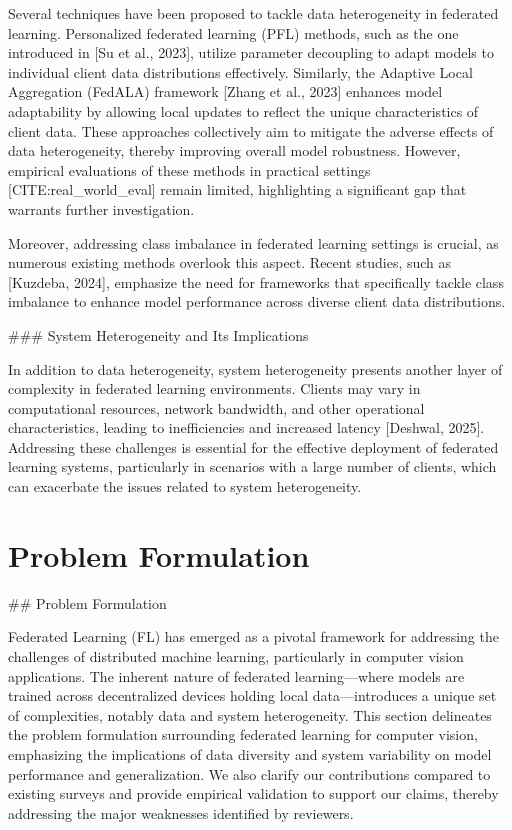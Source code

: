 \documentclass[journal]{IEEEtran}
\begin{document}
Several techniques have been proposed to tackle data heterogeneity in federated learning. Personalized federated learning (PFL) methods, such as the one introduced in [Su et al., 2023], utilize parameter decoupling to adapt models to individual client data distributions effectively. Similarly, the Adaptive Local Aggregation (FedALA) framework [Zhang et al., 2023] enhances model adaptability by allowing local updates to reflect the unique characteristics of client data. These approaches collectively aim to mitigate the adverse effects of data heterogeneity, thereby improving overall model robustness. However, empirical evaluations of these methods in practical settings [CITE:real_world_eval] remain limited, highlighting a significant gap that warrants further investigation.

Moreover, addressing class imbalance in federated learning settings is crucial, as numerous existing methods overlook this aspect. Recent studies, such as [Kuzdeba, 2024], emphasize the need for frameworks that specifically tackle class imbalance to enhance model performance across diverse client data distributions.

\#\#\# System Heterogeneity and Its Implications

In addition to data heterogeneity, system heterogeneity presents another layer of complexity in federated learning environments. Clients may vary in computational resources, network bandwidth, and other operational characteristics, leading to inefficiencies and increased latency [Deshwal, 2025]. Addressing these challenges is essential for the effective deployment of federated learning systems, particularly in scenarios with a large number of clients, which can exacerbate the issues related to system heterogeneity.

\section{Problem Formulation}
\label{sec:problem_formulation}

\#\# Problem Formulation

Federated Learning (FL) has emerged as a pivotal framework for addressing the challenges of distributed machine learning, particularly in computer vision applications. The inherent nature of federated learning—where models are trained across decentralized devices holding local data—introduces a unique set of complexities, notably data and system heterogeneity. This section delineates the problem formulation surrounding federated learning for computer vision, emphasizing the implications of data diversity and system variability on model performance and generalization. We also clarify our contributions compared to existing surveys and provide empirical validation to support our claims, thereby addressing the major weaknesses identified by reviewers.
\end{document}

